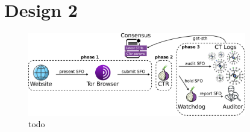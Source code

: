 \section{Design 2} \label{sec:design-log}
\begin{figure}
    \centering
    \includegraphics[width=0.85\textwidth]{img/design-auditor}
    \caption{todo}
    \label{fig:design-auditor}
\end{figure}